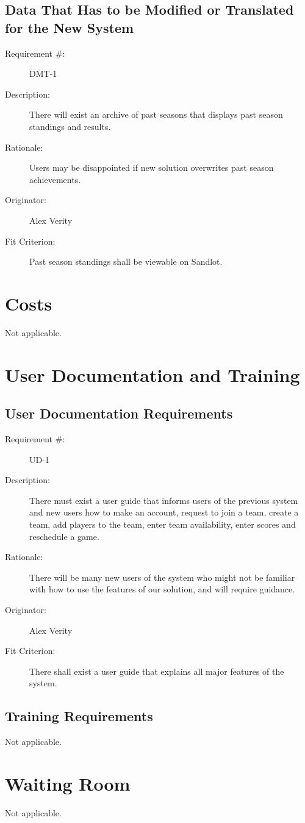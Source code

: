 \documentclass[12pt]{article}
\newenvironment{myreq}[1]{%
\setlist[description]{font=\normalfont\color{darkgray}}%
\begin{tcolorbox}[colframe=black,colback=white, sharp corners, boxrule=1pt]%
\bfseries\color{blue}%
\begin{description}#1}%
{\end{description}\end{tcolorbox}}
\newcommand{\twoinline}[2]{\begin{multicols}{2}#1 #2\end{multicols}}
\newcommand{\reqno}{\item[Requirement \#:]}
\newcommand{\reqdesc}{\item[Description:]}
\newcommand{\reqrat}{\item[Rationale:]}
\newcommand{\reqorig}{\item[Originator:]}
\newcommand{\reqfit}{\item[Fit Criterion:]}
\newcommand{\reqsatis}{\item[Customer Satisfaction:]}
\newcommand{\reqdissat}{\item[Customer Dissatisfaction:]}
\begin{document}
\subsection{Data That Has to be Modified or Translated for the New System}

\begin{myreq}
  \reqno DMT-1
  \reqdesc There will exist an archive of past seasons that displays past
  season standings and results.
  \reqrat Users may be disappointed if new solution overwrites past season
  achievements.
  \reqorig Alex Verity
  \reqfit Past season standings shall be viewable on Sandlot.
  \twoinline
    {\reqsatis 1}
    {\reqdissat 2}
\end{myreq}

\section{Costs}
Not applicable.
\section{User Documentation and Training}
\subsection{User Documentation Requirements}

\begin{myreq}
  \reqno UD-1
  \reqdesc There must exist a user guide that informs users of the previous
  system and new users how to make an account, request to join a team, create
  a team, add players to the team, enter team availability, enter scores and
  reschedule a game.
  \reqrat There will be many new users of the system who might not be familiar
  with how to use the features of our solution, and will require guidance.
  \reqorig Alex Verity
  \reqfit There shall exist a user guide that explains all major features of
  the system.
  \twoinline
    {\reqsatis 3}
    {\reqdissat 1}
\end{myreq}

\subsection{Training Requirements}
Not applicable.

\section{Waiting Room}
Not applicable.
\end{document}
